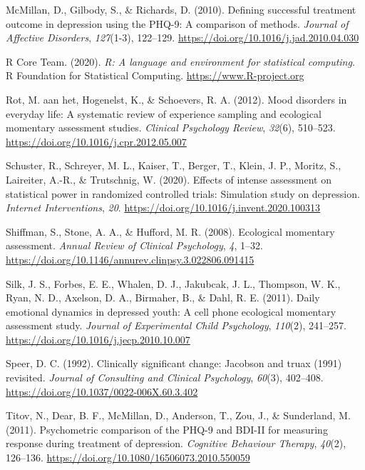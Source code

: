 \documentclass[12pt,twoside]{reedthesis}
\begin{document}
\leavevmode\hypertarget{ref-McMillan.2010}{}%
McMillan, D., Gilbody, S., \& Richards, D. (2010). Defining successful treatment outcome in depression using the PHQ-9: A comparison of methods. \emph{Journal of Affective Disorders}, \emph{127}(1-3), 122--129. \url{https://doi.org/10.1016/j.jad.2010.04.030}

\leavevmode\hypertarget{ref-RCoreTeam.2020}{}%
R Core Team. (2020). \emph{R: A language and environment for statistical computing}. R Foundation for Statistical Computing. \url{https://www.R-project.org}

\leavevmode\hypertarget{ref-Rot.2012}{}%
Rot, M. aan het, Hogenelst, K., \& Schoevers, R. A. (2012). Mood disorders in everyday life: A systematic review of experience sampling and ecological momentary assessment studies. \emph{Clinical Psychology Review}, \emph{32}(6), 510--523. \url{https://doi.org/10.1016/j.cpr.2012.05.007}

\leavevmode\hypertarget{ref-Schuster.2020}{}%
Schuster, R., Schreyer, M. L., Kaiser, T., Berger, T., Klein, J. P., Moritz, S., Laireiter, A.-R., \& Trutschnig, W. (2020). Effects of intense assessment on statistical power in randomized controlled trials: Simulation study on depression. \emph{Internet Interventions}, \emph{20}. \url{https://doi.org/10.1016/j.invent.2020.100313}

\leavevmode\hypertarget{ref-Shiffman.2008}{}%
Shiffman, S., Stone, A. A., \& Hufford, M. R. (2008). Ecological momentary assessment. \emph{Annual Review of Clinical Psychology}, \emph{4}, 1--32. \url{https://doi.org/10.1146/annurev.clinpsy.3.022806.091415}

\leavevmode\hypertarget{ref-Silk.2011}{}%
Silk, J. S., Forbes, E. E., Whalen, D. J., Jakubcak, J. L., Thompson, W. K., Ryan, N. D., Axelson, D. A., Birmaher, B., \& Dahl, R. E. (2011). Daily emotional dynamics in depressed youth: A cell phone ecological momentary assessment study. \emph{Journal of Experimental Child Psychology}, \emph{110}(2), 241--257. \url{https://doi.org/10.1016/j.jecp.2010.10.007}

\leavevmode\hypertarget{ref-Speer.1992}{}%
Speer, D. C. (1992). Clinically significant change: Jacobson and truax (1991) revisited. \emph{Journal of Consulting and Clinical Psychology}, \emph{60}(3), 402--408. \url{https://doi.org/10.1037/0022-006X.60.3.402}

\leavevmode\hypertarget{ref-Titov.2011}{}%
Titov, N., Dear, B. F., McMillan, D., Anderson, T., Zou, J., \& Sunderland, M. (2011). Psychometric comparison of the PHQ-9 and BDI-II for measuring response during treatment of depression. \emph{Cognitive Behaviour Therapy}, \emph{40}(2), 126--136. \url{https://doi.org/10.1080/16506073.2010.550059}
\end{document}
